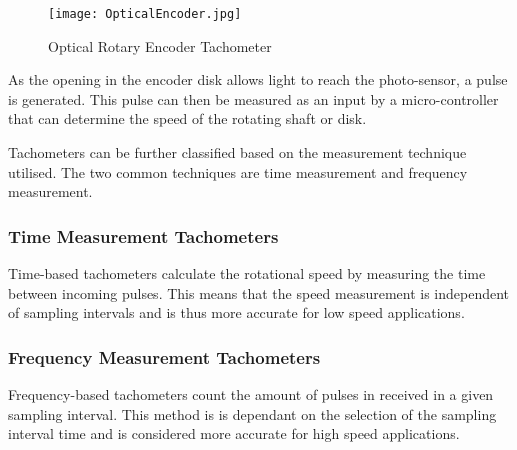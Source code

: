 \begin{figure}[H]
	\begin{center}
		\texttt{[image: OpticalEncoder.jpg]}
		\caption{Optical Rotary Encoder Tachometer}
		\label{fig:RotaryEncoder}
		\citep{analogic:2018}
	\end{center}
\end{figure}

\vspace*{-0.5cm}

As the opening in the encoder disk allows light to reach the photo-sensor, a pulse is generated. This pulse can then be measured as an input by a micro-controller that can determine the speed of the rotating shaft or disk.

Tachometers can be further classified based on the measurement technique utilised. The two common techniques are time measurement and frequency measurement. 

\subsubsection{Time Measurement Tachometers}
Time-based tachometers calculate the rotational speed by measuring the time between incoming pulses. This means that the speed measurement is independent of sampling intervals and is thus more accurate for low speed applications.\citep{analogic:2018}

\subsubsection{Frequency Measurement Tachometers}
Frequency-based tachometers count the amount of pulses in received in a given sampling interval. This method is is dependant on the selection of the sampling interval time and is considered more accurate for high speed applications. \citep{analogic:2018}
